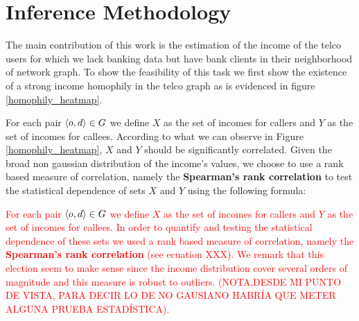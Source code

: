 \section{Inference Methodology}






The main contribution of this work is the estimation of the income of the telco users for which we lack banking data but have bank clients in their neighborhood of network graph. To show the feasibility of this task we first show the existence of a strong income homophily in the telco graph as is evidenced in figure \ref{homophily_heatmap}.

For each pair \( \left< o, d \right> \in \mathlarger{G} \) we define \( X \) as the set of incomes for callers and \( Y \) as the set of incomes for callees. According to what we can observe in Figure \ref{homophily_heatmap}, \( X \) and \( Y \) should be significantly correlated. Given the broad non gaussian distribution of the income's values, we choose to use a rank based measure of correlation, namely the \textbf{Spearman's rank correlation} to test the statistical dependence of sets \( X \) and \( Y \) using the following formula: 

\textcolor{Red}{
For each pair \( \left< o, d \right> \in \mathlarger{G} \) we define \( X \) as the set of incomes for callers and \( Y \) as the set of incomes for callees. In order to quantify and testing the statistical dependence of these sets we used a rank based measure of correlation, namely the \textbf{Spearman's rank correlation} (see ecuation XXX). We remark that this election seem to make sense since the income distribution cover several orders of magnitude and this measure is robust to outliers. (NOTA,DESDE MI PUNTO DE VISTA, PARA DECIR LO DE NO GAUSIANO HABRÍA QUE METER ALGUNA PRUEBA ESTADÍSTICA). 
}

